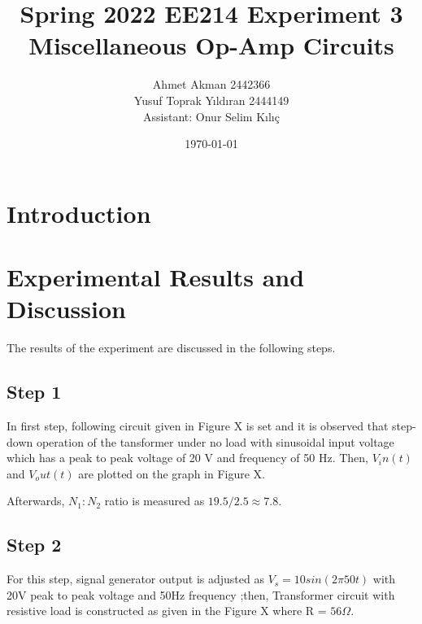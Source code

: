 \documentclass[letterpaper,12pt]{article}
\begin{document}
\thispagestyle{empty}

\title{Spring 2022 EE214 Experiment 3  \protect\\ Miscellaneous Op-Amp Circuits}
\author{Ahmet Akman 2442366 \protect\\ Yusuf Toprak Yıldıran 2444149 \protect\\ Assistant: Onur Selim Kılıç}
\date{\today}
\maketitle
\tableofcontents
\section{Introduction}

\section{Experimental Results and Discussion}
The results of the experiment are discussed in the following steps.
%
\subsection{Step 1}

In first step, following circuit given in Figure X is set and it is observed that step-down operation of the tansformer under no load with sinusoidal input voltage which has a peak to peak voltage of 20 V and frequency of
50 Hz. Then, \(V_in(t) \) and \(V_out(t)\) are plotted on the graph in Figure X.

Afterwards, \(N_1:N_2\) ratio is measured as \(19.5/2.5 \approx 7.8 \).

%
\subsection{Step 2}
For this step, signal generator output is adjusted as \(𝑉_s = 10sin(2\pi50𝑡)\) with 20V peak to peak voltage and 50Hz frequency ;then, Transformer circuit with resistive load is constructed as given in the Figure X where R = \(56\Omega \).  
\end{document}
